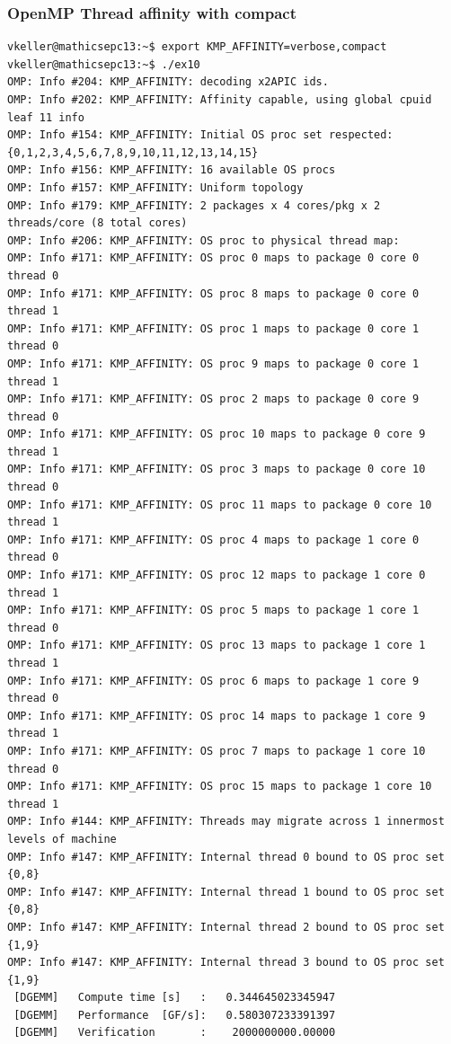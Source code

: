 \begin{frame}[containsverbatim]
  \frametitle{OpenMP Thread affinity with compact}
  \begingroup
  \fontsize{6pt}{12pt}\linespread{0.5}\selectfont
\begin{verbatim}
vkeller@mathicsepc13:~$ export KMP_AFFINITY=verbose,compact
vkeller@mathicsepc13:~$ ./ex10
OMP: Info #204: KMP_AFFINITY: decoding x2APIC ids.
OMP: Info #202: KMP_AFFINITY: Affinity capable, using global cpuid leaf 11 info
OMP: Info #154: KMP_AFFINITY: Initial OS proc set respected: {0,1,2,3,4,5,6,7,8,9,10,11,12,13,14,15}
OMP: Info #156: KMP_AFFINITY: 16 available OS procs
OMP: Info #157: KMP_AFFINITY: Uniform topology
OMP: Info #179: KMP_AFFINITY: 2 packages x 4 cores/pkg x 2 threads/core (8 total cores)
OMP: Info #206: KMP_AFFINITY: OS proc to physical thread map:
OMP: Info #171: KMP_AFFINITY: OS proc 0 maps to package 0 core 0 thread 0
OMP: Info #171: KMP_AFFINITY: OS proc 8 maps to package 0 core 0 thread 1
OMP: Info #171: KMP_AFFINITY: OS proc 1 maps to package 0 core 1 thread 0
OMP: Info #171: KMP_AFFINITY: OS proc 9 maps to package 0 core 1 thread 1
OMP: Info #171: KMP_AFFINITY: OS proc 2 maps to package 0 core 9 thread 0
OMP: Info #171: KMP_AFFINITY: OS proc 10 maps to package 0 core 9 thread 1
OMP: Info #171: KMP_AFFINITY: OS proc 3 maps to package 0 core 10 thread 0
OMP: Info #171: KMP_AFFINITY: OS proc 11 maps to package 0 core 10 thread 1
OMP: Info #171: KMP_AFFINITY: OS proc 4 maps to package 1 core 0 thread 0
OMP: Info #171: KMP_AFFINITY: OS proc 12 maps to package 1 core 0 thread 1
OMP: Info #171: KMP_AFFINITY: OS proc 5 maps to package 1 core 1 thread 0
OMP: Info #171: KMP_AFFINITY: OS proc 13 maps to package 1 core 1 thread 1
OMP: Info #171: KMP_AFFINITY: OS proc 6 maps to package 1 core 9 thread 0
OMP: Info #171: KMP_AFFINITY: OS proc 14 maps to package 1 core 9 thread 1
OMP: Info #171: KMP_AFFINITY: OS proc 7 maps to package 1 core 10 thread 0
OMP: Info #171: KMP_AFFINITY: OS proc 15 maps to package 1 core 10 thread 1
OMP: Info #144: KMP_AFFINITY: Threads may migrate across 1 innermost levels of machine
OMP: Info #147: KMP_AFFINITY: Internal thread 0 bound to OS proc set {0,8}
OMP: Info #147: KMP_AFFINITY: Internal thread 1 bound to OS proc set {0,8}
OMP: Info #147: KMP_AFFINITY: Internal thread 2 bound to OS proc set {1,9}
OMP: Info #147: KMP_AFFINITY: Internal thread 3 bound to OS proc set {1,9}
 [DGEMM]   Compute time [s]   :   0.344645023345947
 [DGEMM]   Performance  [GF/s]:   0.580307233391397
 [DGEMM]   Verification       :    2000000000.00000
\end{verbatim}
  \endgroup
\end{frame}




